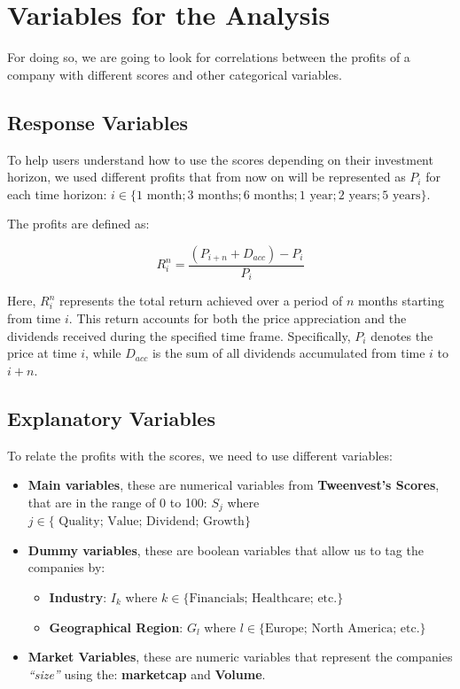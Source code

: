 \documentclass[11pt,english,a4paper,hidelinks]{book}
\begin{document}
\section{Variables for the Analysis}

For doing so, we are going to look for correlations between the profits of a company with different scores and other categorical variables.

\subsection{Response Variables}
To help users understand how to use the scores depending on their investment horizon, we used different profits that from now on will be represented as \(P_i\) for each time horizon: \(i \in \{1 \text{ month}; 3 \text{ months}; 6 \text{ months}; 1 \text{ year}; 2 \text{ years}; 5 \text{ years}\}\).

\vspace{0.5cm}
\noindent The profits are defined as:

\begin{equation}
    R_i^n = \frac{(P_{i+n} + D_{acc}) - P_{i}}{P_{i}}
\end{equation}

\noindent Here, \(R_i^n\) represents the total return achieved over a period of \(n\) months starting from time \(i\). This return accounts for both the price appreciation and the dividends received during the specified time frame. Specifically, \(P_i\) denotes the price at time \(i\), while \(D_{acc}\) is the sum of all dividends accumulated from time \(i\) to \(i+n\).


\subsection{Explanatory Variables}
To relate the profits with the scores, we need to use different variables:
\begin{itemize}
    \item \textbf{Main variables}, these are numerical variables from \textbf{Tweenvest's Scores}, that are in the range of 0 to 100: \(S_j\) where   \(j \in \{\text{ Quality; Value; Dividend; Growth}\}\)
    \item \textbf{Dummy variables}, these are boolean variables that allow us to tag the companies by:
    \begin{itemize}
        \item \textbf{Industry}: \(I_k\) where \(k \in \{\text{Financials; Healthcare; etc.}\}\)
        \item \textbf{Geographical Region}: \(G_l\) where \(l \in \{\text{Europe; North America; etc.}\}\)
    \end{itemize}
    \item \textbf{Market Variables}, these are numeric variables that represent the companies \textit{``size''} using the: \textbf{\acrshort{marketcap}} and \textbf{Volume}.
\end{itemize}
\end{document}

